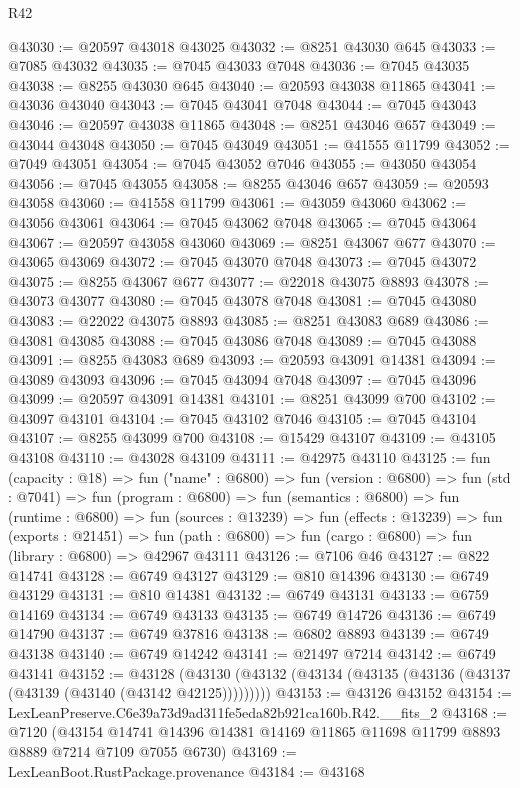 \begin{lexlean}{R42}
\begin{coremodule}
{@43030 := @20597 @43018 @43025
@43032 := @8251 @43030 @645
@43033 := @7085 @43032
@43035 := @7045 @43033 @7048
@43036 := @7045 @43035
@43038 := @8255 @43030 @645
@43040 := @20593 @43038 @11865
@43041 := @43036 @43040
@43043 := @7045 @43041 @7048
@43044 := @7045 @43043
@43046 := @20597 @43038 @11865
@43048 := @8251 @43046 @657
@43049 := @43044 @43048
@43050 := @7045 @43049
@43051 := @41555 @11799
@43052 := @7049 @43051
@43054 := @7045 @43052 @7046
@43055 := @43050 @43054
@43056 := @7045 @43055
@43058 := @8255 @43046 @657
@43059 := @20593 @43058
@43060 := @41558 @11799
@43061 := @43059 @43060
@43062 := @43056 @43061
@43064 := @7045 @43062 @7048
@43065 := @7045 @43064
@43067 := @20597 @43058 @43060
@43069 := @8251 @43067 @677
@43070 := @43065 @43069
@43072 := @7045 @43070 @7048
@43073 := @7045 @43072
@43075 := @8255 @43067 @677
@43077 := @22018 @43075 @8893
@43078 := @43073 @43077
@43080 := @7045 @43078 @7048
@43081 := @7045 @43080
@43083 := @22022 @43075 @8893
@43085 := @8251 @43083 @689
@43086 := @43081 @43085
@43088 := @7045 @43086 @7048
@43089 := @7045 @43088
@43091 := @8255 @43083 @689
@43093 := @20593 @43091 @14381
@43094 := @43089 @43093
@43096 := @7045 @43094 @7048
@43097 := @7045 @43096
@43099 := @20597 @43091 @14381
@43101 := @8251 @43099 @700
@43102 := @43097 @43101
@43104 := @7045 @43102 @7046
@43105 := @7045 @43104
@43107 := @8255 @43099 @700
@43108 := @15429 @43107
@43109 := @43105 @43108
@43110 := @43028 @43109
@43111 := @42975 @43110
@43125 := fun (capacity : @18) =>
  fun ("name" : @6800) =>
  fun (version : @6800) =>
  fun (std : @7041) =>
  fun (program : @6800) =>
  fun (semantics : @6800) =>
  fun (runtime : @6800) =>
  fun (sources : @13239) =>
  fun (effects : @13239) =>
  fun (exports : @21451) =>
  fun (path : @6800) => fun (cargo : @6800) => fun (library : @6800) => @42967 @43111
@43126 := @7106 @46
@43127 := @822 @14741
@43128 := @6749 @43127
@43129 := @810 @14396
@43130 := @6749 @43129
@43131 := @810 @14381
@43132 := @6749 @43131
@43133 := @6759 @14169
@43134 := @6749 @43133
@43135 := @6749 @14726
@43136 := @6749 @14790
@43137 := @6749 @37816
@43138 := @6802 @8893
@43139 := @6749 @43138
@43140 := @6749 @14242
@43141 := @21497 @7214
@43142 := @6749 @43141
@43152 := @43128
    (@43130 (@43132 (@43134 (@43135 (@43136 (@43137 (@43139 (@43140 (@43142 @42125)))))))))
@43153 := @43126 @43152
@43154 := LexLeanPreserve.C6e39a73d9ad311fe5eda82b921ca160b.R42.__fits_2
@43168 := @7120
    (@43154 @14741 @14396 @14381 @14169 @11865 @11698 @11799 @8893 @8889 @7214 @7109 @7055 @6730)
@43169 := LexLeanBoot.RustPackage.provenance
@43184 := @43168
}
\end{coremodule}
\end{lexlean}
